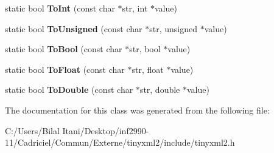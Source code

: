 \begin{DoxyCompactItemize}
\item 
static bool {\bfseries To\+Int} (const char $\ast$str, int $\ast$value)\hypertarget{classtinyxml2_1_1_x_m_l_util_ac7fa220dd1c428ed6a77850d56a6e4bf}{}\label{classtinyxml2_1_1_x_m_l_util_ac7fa220dd1c428ed6a77850d56a6e4bf}

\item 
static bool {\bfseries To\+Unsigned} (const char $\ast$str, unsigned $\ast$value)\hypertarget{classtinyxml2_1_1_x_m_l_util_a46f7e9542929001e726853ed8b571c07}{}\label{classtinyxml2_1_1_x_m_l_util_a46f7e9542929001e726853ed8b571c07}

\item 
static bool {\bfseries To\+Bool} (const char $\ast$str, bool $\ast$value)\hypertarget{classtinyxml2_1_1_x_m_l_util_ae1692c644a807da2cd9e1e45f79a102f}{}\label{classtinyxml2_1_1_x_m_l_util_ae1692c644a807da2cd9e1e45f79a102f}

\item 
static bool {\bfseries To\+Float} (const char $\ast$str, float $\ast$value)\hypertarget{classtinyxml2_1_1_x_m_l_util_ac13b56b82e7f1d2d3954666b76c67d22}{}\label{classtinyxml2_1_1_x_m_l_util_ac13b56b82e7f1d2d3954666b76c67d22}

\item 
static bool {\bfseries To\+Double} (const char $\ast$str, double $\ast$value)\hypertarget{classtinyxml2_1_1_x_m_l_util_a7e37ab30ba19c2b02042ab093172e9b8}{}\label{classtinyxml2_1_1_x_m_l_util_a7e37ab30ba19c2b02042ab093172e9b8}

\end{DoxyCompactItemize}


The documentation for this class was generated from the following file\+:\begin{DoxyCompactItemize}
\item 
C\+:/\+Users/\+Bilal Itani/\+Desktop/inf2990-\/11/\+Cadriciel/\+Commun/\+Externe/tinyxml2/include/tinyxml2.\+h\end{DoxyCompactItemize}

